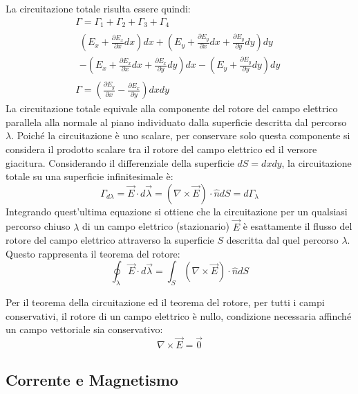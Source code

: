 \documentclass{article}
\numberwithin{equation}{subsection}
\begin{document}
La circuitazione totale risulta essere quindi:
\begin{gather*}
    \Gamma=\Gamma_1+\Gamma_2+\Gamma_3+\Gamma_4\\
    \begin{matrix}
        \displaystyle\left(E_x+\frac{\partial E_x}{\partial x}dx\right)dx+\left(E_y+\frac{\partial E_y}{\partial x}dx+\frac{\partial E_y}{\partial y}dy\right)dy\\
        \displaystyle-\left(E_x+\frac{\partial E_x}{\partial x}dx+\frac{\partial E_x}{\partial y}dy\right)dx-\left(E_y+\frac{\partial E_y}{\partial y}dy\right)dy
    \end{matrix}\\
    \Gamma=\left(\displaystyle\frac{\partial E_y}{\partial x}-\frac{\partial E_x}{\partial y}\right)dxdy
\end{gather*}
La circuitazione totale equivale alla componente del rotore del campo elettrico parallela alla normale al piano individuato dalla superficie descritta dal percorso $\lambda$. 
Poiché la circuitazione è uno scalare, per conservare solo questa componente si considera il prodotto scalare tra il rotore del campo elettrico ed il versore giacitura. 
Considerando il differenziale della superficie $dS=dxdy$, la circuitazione totale su una superficie infinitesimale è:
\begin{equation*}
    \Gamma_{d\lambda}=\vec{E}\cdot d\vec{\lambda}=({\nabla}\times\vec{E})\cdot \hat{n}dS=d\Gamma_\lambda
\end{equation*}
Integrando quest'ultima equazione si ottiene che la circuitazione per un qualsiasi percorso chiuso $\lambda$ di un campo elettrico (stazionario) $\vec{E}$ è esattamente il 
flusso del rotore del campo elettrico attraverso la superficie $S$ descritta dal quel percorso $\lambda$. Questo rappresenta il teorema del rotore: 
\begin{equation}
    \displaystyle\oint_{\lambda}\vec{E}\cdot d\vec{\lambda}=\int_S({\nabla}\times\vec{E})\cdot\hat{n}dS
\end{equation}

Per il teorema della circuitazione ed il teorema del rotore, per tutti i campi conservativi, il rotore di un campo elettrico è nullo, condizione necessaria affinché un campo 
vettoriale sia conservativo: 
\begin{equation}
    {\nabla}\times\vec{E}=\vec0
\end{equation}

\subsection{Corrente e Magnetismo}
\end{document}
